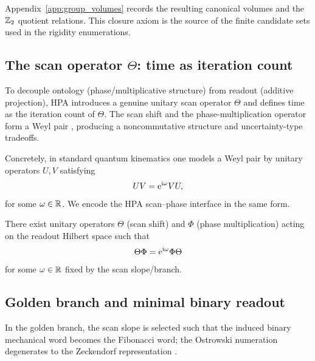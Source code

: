 Appendix~\ref{app:group_volumes} records the resulting canonical volumes and the $\mathbb{Z}_2$ quotient relations. This closure axiom is the source of the finite candidate sets used in the rigidity enumerations.

\subsection{The scan operator \texorpdfstring{$\Theta$}{Theta}: time as iteration count}
To decouple ontology (phase/multiplicative structure) from readout (additive projection), HPA introduces a genuine unitary scan operator $\Theta$ and defines time as the iteration count of $\Theta$. The scan shift and the phase-multiplication operator form a Weyl pair \cite{Hall2013,Folland1989}, producing a noncommutative structure and uncertainty-type tradeoffs.

Concretely, in standard quantum kinematics one models a Weyl pair by unitary operators $U,V$ satisfying
\begin{equation}
UV=\mathrm{e}^{\mathrm{i}\omega}VU,
\end{equation}
for some $\omega\in\mathbb{R}$. We encode the HPA scan--phase interface in the same form.

\begin{axiom}\label{ax:scan_phase_weyl}
There exist unitary operators $\Theta$ (scan shift) and $\Phi$ (phase multiplication) acting on the readout Hilbert space such that
\begin{equation}
\Theta\Phi=\mathrm{e}^{\mathrm{i}\omega}\Phi\Theta
\end{equation}
for some $\omega\in\mathbb{R}$ fixed by the scan slope/branch.
\end{axiom}

\subsection{Golden branch and minimal binary readout}
In the golden branch, the scan slope is selected such that the induced binary mechanical word becomes the Fibonacci word; the Ostrowski numeration degenerates to the Zeckendorf representation \cite{MorseHedlund1940,Lothaire2002,Zeckendorf1972}.

